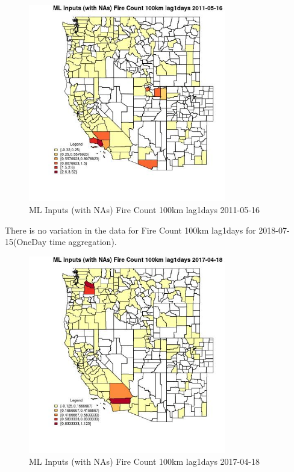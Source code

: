\begin{figure} 
\centering  
\includegraphics[width=0.77\textwidth]{Code_Outputs/Report_ML_input_PM25_Step4_part_e_de_duplicated_aves_compiled_2019-05-21wNAs_CountyFire_Count_100km_lag1daysMean2011-05-16.jpg} 
\caption{\label{fig:Report_ML_input_PM25_Step4_part_e_de_duplicated_aves_compiled_2019-05-21wNAsCountyFire_Count_100km_lag1daysMean2011-05-16}ML Inputs (with NAs) Fire Count 100km lag1days 2011-05-16} 
\end{figure} 
 

There is no variation in the data for Fire Count 100km lag1days for 2018-07-15(OneDay time aggregation). 
 

\begin{figure} 
\centering  
\includegraphics[width=0.77\textwidth]{Code_Outputs/Report_ML_input_PM25_Step4_part_e_de_duplicated_aves_compiled_2019-05-21wNAs_CountyFire_Count_100km_lag1daysMean2017-04-18.jpg} 
\caption{\label{fig:Report_ML_input_PM25_Step4_part_e_de_duplicated_aves_compiled_2019-05-21wNAsCountyFire_Count_100km_lag1daysMean2017-04-18}ML Inputs (with NAs) Fire Count 100km lag1days 2017-04-18} 
\end{figure} 
 

